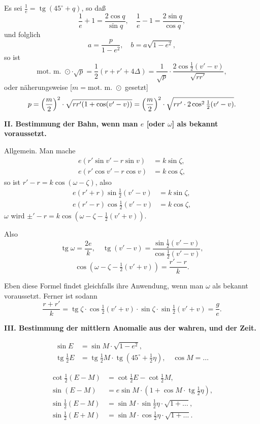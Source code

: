 \documentclass[12pt,a4paper]{article}
\DeclareMathOperator{\tg}{tg}
\theoremstyle{plain}
\theoremstyle{definition}
\theoremstyle{remark}
\begin{document}
Es sei $\frac{1}{e} = \tg(45^\circ + q)$, so daß
\[
\frac{1}{e} + 1 = \frac{2\cos q}{\sin q}, \quad \frac{1}{e} - 1 = \frac{2\sin q}{\cos q},
\]
und folglich
\[
a = \frac{p}{1 - e^2}, \quad b = a\sqrt{1 - e^2},
\]
so ist
\[
\text{mot. m. } \odot \cdot \sqrt{p} = \frac{1}{2}(r + r' + 4\Delta) = \frac{1}{\sqrt{p}} \cdot \frac{2\cos\tfrac{1}{2}(v' - v)}{\sqrt{rr'}},
\]
oder näherungsweise [$m = \text{mot. m. } \odot$ gesetzt]
\[
p = \Bigl(\frac{m}{2}\Bigr)^2 \cdot \sqrt{rr'(1 + \cos(v' - v))} = \Bigl(\frac{m}{2}\Bigr)^2 \cdot \sqrt{rr' \cdot 2\cos^2\tfrac{1}{2}(v' - v)}.
\]

\newpage

\textbf{II. Bestimmung der Bahn, wenn man $e$ [oder $\omega$] als bekannt voraussetzt.}

Allgemein. Man mache
\begin{align*}
e(r' \sin v' - r \sin v) &= k \sin\zeta, \\
e(r' \cos v' - r \cos v) &= k \cos\zeta,
\end{align*}
so ist $r' - r = k \cos(\omega - \zeta)$, also
\begin{align*}
e(r' + r) \sin\tfrac{1}{2}(v' - v) &= k \sin\zeta, \\
e(r' - r) \cos\tfrac{1}{2}(v' - v) &= k \cos\zeta,
\end{align*}
$\omega$ wird $\pm' - r = k \cos(\omega - \zeta - \tfrac{1}{2}(v' + v))$.

Also
\[
\tg\omega = \frac{2e}{k}, \quad \tg(v' - v) = \frac{\sin\tfrac{1}{2}(v' - v)}{\cos\tfrac{1}{2}(v' - v)},
\]
\[
\cos(\omega - \zeta - \tfrac{1}{2}(v' + v)) = \frac{r' - r}{k}.
\]

Eben diese Formel findet gleichfalls ihre Anwendung, wenn man $\omega$ als bekannt voraussetzt. Ferner ist sodann
\[
\frac{r + r'}{k} = \tg\zeta \cdot \cos\tfrac{1}{2}(v' + v) \cdot \sin\zeta \cdot \sin\tfrac{1}{2}(v' + v) = \frac{g}{e}.
\]

\newpage

\textbf{III. Bestimmung der mittlern Anomalie aus der wahren, und der Zeit.}

\begin{align*}
\sin E &= \sin M \cdot \sqrt{1 - e^2}, \\
\tg\tfrac{1}{2}E &= \tg\tfrac{1}{2}M \cdot \tg(45^\circ + \tfrac{1}{2}\eta), \quad \cos M = \dots
\end{align*}

\begin{align*}
\cot\tfrac{1}{2}(E - M) &= \cot\tfrac{1}{2}E - \cot\tfrac{1}{2}M, \\
\sin(E - M) &= e \sin M \cdot (1 + \cos M \cdot \tg\tfrac{1}{2}\eta), \\
\sin\tfrac{1}{2}(E - M) &= \sin M \cdot \sin\tfrac{1}{2}\eta \cdot \sqrt{1 + \dots}, \\
\sin\tfrac{1}{2}(E + M) &= \sin M \cdot \cos\tfrac{1}{2}\eta \cdot \sqrt{1 + \dots}.
\end{align*}
\end{document}
